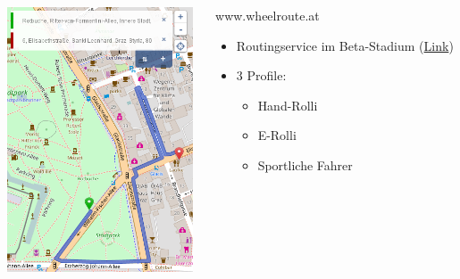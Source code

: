 \documentclass{beamer}
\begin{document}
\begin{frame}{}

  \begin{columns}[c]
    \begin{column}[T]{.6\textwidth}
      \begin{center}
      \vspace{-1cm}
      \includegraphics[width=5.5cm]{routing1_normal.png}
      \end{center}
    \end{column}
    \begin{column}[T]{.4\textwidth}
      www.wheelroute.at
      \begin{itemize}
      \vspace{1cm}
        \item Routingservice im Beta-Stadium (\href{http://mm.linuxtage.at/osm/routing/wheelchair-normal/?z=17\&center=47.072643\%2C15.452845\&loc=47.073045\%2C15.446059\&loc=47.073841\%2C15.448145\&hl=en\&ly=\&alt=\&df=\&srv=}{Link})
              \pause
      \vspace{1cm}
            \item 3 Profile:
              \begin{itemize}
                \item Hand-Rolli
                \item E-Rolli
                \item Sportliche Fahrer
          \end{itemize}
        \end{itemize}

    \end{column}
  \end{columns}

\end{frame}
\end{document}
